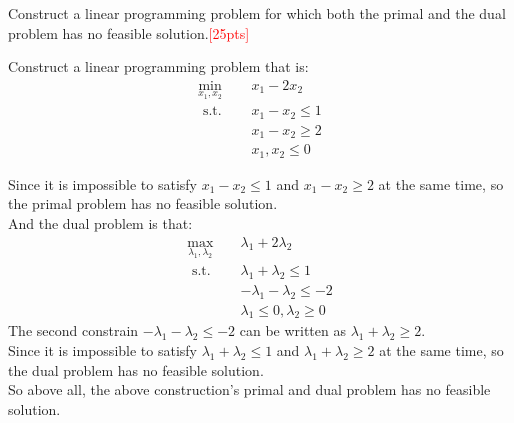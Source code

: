 \documentclass[10pt]{article}
\newenvironment{problem}[2][Problem]{\begin{trivlist}
\item[\hskip \labelsep {\bfseries #1}\hskip \labelsep {\bfseries #2.}]}{\end{trivlist}}
\begin{document}
\begin{problem}{4}
    Construct a linear programming problem for which both the primal and the dual problem has no feasible solution.\textcolor{red}{[25pts]}

Construct a linear programming problem that is:\\
\begin{equation}
\begin{aligned}
\min_{x_1,x_2} \quad & x_1-2x_2 \\
\text { s.t. } \quad & x_1 - x_2 \leq 1 \\
& x_1 - x_2 \geq 2 \\
& x_1,x_2 \leq 0
\end{aligned}
\end{equation}

Since it is impossible to satisfy $x_1 - x_2 \leq 1$ and $x_1 - x_2 \geq 2$ at the same time, so the primal problem has no feasible solution.\\
And the dual problem is that:\\
\begin{equation}
\begin{aligned}
\max_{\lambda_1,\lambda_2} \quad & \lambda_1 + 2\lambda_2 \\
\text { s.t. } \quad & \lambda_1 + \lambda_2 \leq 1 \\
& -\lambda_1 - \lambda_2 \leq -2 \\
& \lambda_1\leq 0,\lambda_2 \geq 0
\end{aligned}
\end{equation}
The second constrain $-\lambda_1 - \lambda_2 \leq -2$ can be written as $\lambda_1 + \lambda_2 \geq 2$.\\
Since it is impossible to satisfy $\lambda_1 + \lambda_2 \leq 1$ and $\lambda_1 + \lambda_2 \geq 2$ at the same time, so the dual problem has no feasible solution.\\

So above all, the above construction's primal and dual problem has no feasible solution.\\

\end{problem}
\end{document}
